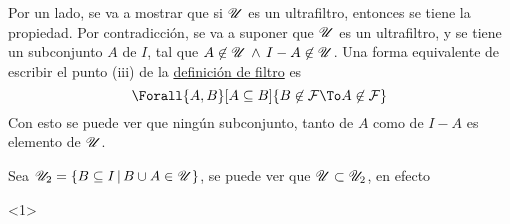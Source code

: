 \begin{demo}[i] Por un lado, se va a mostrar que si $\mathscr{U}$ es un ultrafiltro,
  entonces se tiene la propiedad. Por contradicción, se va a suponer
  que $\mathscr{U}$ es un ultrafiltro, y se tiene un subconjunto $A$ de $I$, tal
  que $A \not\in \mathscr{U} \,\land\, I-A\not\in\mathscr{U}$. Una forma equivalente de escribir
  el punto (iii) de la \hyperref[def:filtro]{definición de filtro} es
  \[\Forall{A,B}[A\subseteq B]{B\not\in\F \To A\not\in\F}\]
  Con esto se puede ver que ningún subconjunto, tanto de $A$ como de $I-A$
  es elemento de $\mathscr{U}$.

  Sea $\mathscr{U}_2 = \{B \subseteq I \,|\, B \cup A \in \mathscr{U}\}$, se puede ver que
  $\mathscr{U} \subset \mathscr{U}_2$, en efecto
  \begin{longderivation}<1>
      \\
    \To\\
      \\
    \equiv\\
  \end{longderivation}


\end{demo}
